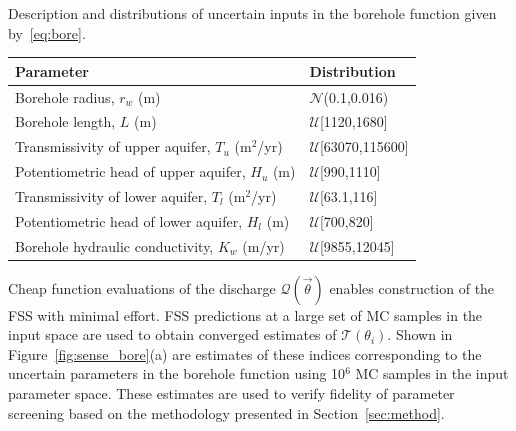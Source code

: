 \begin{table}[ht]
\renewcommand*{\arraystretch}{1.2}
\caption{Description and distributions of uncertain inputs in the borehole function
given by~\eqref{eq:bore}.}
\label{tab:bore}
\end{table}
\begin{center}
\begin{tabular}{ll}
\toprule
\textbf{Parameter} & \textbf{Distribution} \\ 
\bottomrule
Borehole radius, $r_w$ (m) & $\mathcal{N}$(0.1,0.016) \\
Borehole length, $L$ (m) & $\mathcal{U}$[1120,1680] \\
Transmissivity of upper aquifer, $T_u$ (m$^2$/yr) & $\mathcal{U}$[63070,115600] \\
Potentiometric head of upper aquifer, $H_u$ (m) & $\mathcal{U}$[990,1110] \\
Transmissivity of lower aquifer, $T_l$ (m$^2$/yr) & $\mathcal{U}$[63.1,116] \\
Potentiometric head of lower aquifer, $H_l$ (m) & $\mathcal{U}$[700,820] \\
Borehole hydraulic conductivity, $K_w$ (m/yr) & $\mathcal{U}$[9855,12045] \\
\bottomrule
\end{tabular}
\end{center}

%
Cheap function evaluations of the discharge $\mathcal{Q}(\vec{\theta})$ 
enables construction of the FSS with minimal effort. FSS predictions at
a large set of MC samples in the input space are used to obtain converged
estimates of $\mathcal{T}(\theta_i)$. Shown in
Figure~\ref{fig:sense_bore}(a) are estimates of these indices corresponding to the
uncertain parameters in the borehole function using 10$^6$ MC
samples in the input parameter space. 
These estimates are used to verify fidelity of
parameter screening based on the methodology presented in Section~\ref{sec:method}. 

